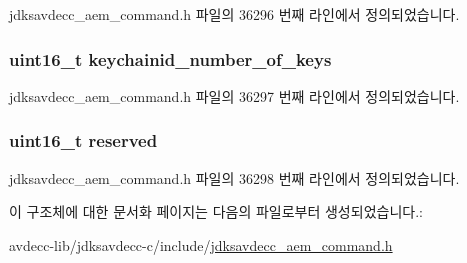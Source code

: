 jdksavdecc\+\_\+aem\+\_\+command.\+h 파일의 36296 번째 라인에서 정의되었습니다.

\subsubsection[{\texorpdfstring{keychainid\+\_\+number\+\_\+of\+\_\+keys}{keychainid_number_of_keys}}]{\setlength{\rightskip}{0pt plus 5cm}uint16\+\_\+t keychainid\+\_\+number\+\_\+of\+\_\+keys}\hypertarget{structjdksavdecc__aem__command__auth__get__key__list__response_a857e21874a37fd25582ef7c6f08c41a8}{}\label{structjdksavdecc__aem__command__auth__get__key__list__response_a857e21874a37fd25582ef7c6f08c41a8}


jdksavdecc\+\_\+aem\+\_\+command.\+h 파일의 36297 번째 라인에서 정의되었습니다.

\subsubsection[{\texorpdfstring{reserved}{reserved}}]{\setlength{\rightskip}{0pt plus 5cm}uint16\+\_\+t reserved}\hypertarget{structjdksavdecc__aem__command__auth__get__key__list__response_a5a6ed8c04a3db86066924b1a1bf4dad3}{}\label{structjdksavdecc__aem__command__auth__get__key__list__response_a5a6ed8c04a3db86066924b1a1bf4dad3}


jdksavdecc\+\_\+aem\+\_\+command.\+h 파일의 36298 번째 라인에서 정의되었습니다.



이 구조체에 대한 문서화 페이지는 다음의 파일로부터 생성되었습니다.\+:\begin{DoxyCompactItemize}
\item 
avdecc-\/lib/jdksavdecc-\/c/include/\hyperlink{jdksavdecc__aem__command_8h}{jdksavdecc\+\_\+aem\+\_\+command.\+h}\end{DoxyCompactItemize}
